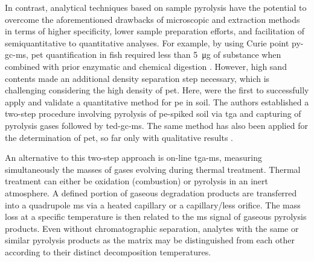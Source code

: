 In contrast, analytical techniques based on sample pyrolysis have the potential to overcome the aforementioned drawbacks of microscopic and extraction methods in terms of higher specificity, lower sample preparation efforts, and facilitation of semiquantitative to quantitative analyses.
For example, by using Curie point \ac{py-gc-ms}, \ac{pet} quantification in fish required less than \SI{5}{\micro\gram} of substance when combined with prior enzymatic and chemical digestion \citep{FischerSimultaneous2017}.
However, high sand contents made an additional density separation step necessary, which is challenging considering the high density of \ac{pet}. Here, \citet{DumichenAnalysis2015} were the first to successfully apply and validate a quantitative method for \ac{pe} in soil.
The authors established a two-step procedure involving pyrolysis of \ac{pe}-spiked soil via \ac{tga} and capturing of pyrolysis gases followed by \ac{ted-gc-ms}. The same method has also been applied for the determination of \ac{pet}, so far only with qualitative results \citep{DumichenFast2017}.

An alternative to this two-step approach is on-line \ac{tga-ms}, measuring simultaneously the masses of gases evolving during thermal treatment. Thermal treatment can either be oxidation (combustion) or pyrolysis in an inert  atmosphere. A defined portion of gaseous degradation products are transferred into a quadrupole \ac{ms} via a heated capillary or a capillary\-/less orifice. The mass loss at a specific temperature is then related to the \ac{ms} signal of gaseous pyrolysis products.
Even without chromatographic separation, analytes with the same or similar pyrolysis products as the matrix may be distinguished from each other according to their distinct decomposition temperatures.

